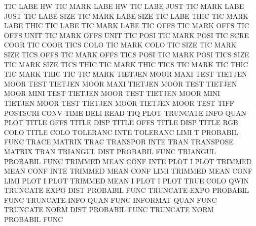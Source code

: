 TIC      LABE HW                        TIC      MARK LABE HW
TIC      LABE JUST                      TIC      MARK LABE JUST
TIC      LABE SIZE                      TIC      MARK LABE SIZE
TIC      LABE THIC                      TIC      MARK LABE THIC
TIC      LABE                           TIC      MARK LABE
TIC      OFFS                           TIC      MARK OFFS
TIC      OFFS UNIT                      TIC      MARK OFFS UNIT
TIC      POSI                           TIC      MARK POSI
TIC      SCRE COOR                      TIC      COOR
TICS     COLO                           TIC      MARK COLO
TIC      SIZE                           TIC      MARK SIZE
TICS     OFFS                           TIC      MARK OFFS
TICS     POSI                           TIC      MARK POSI
TICS     SIZE                           TIC      MARK SIZE
TICS     THIC                           TIC      MARK THIC
TICS                                    TIC      MARK
TIC      THIC                           TIC      MARK THIC
TIC                                     TIC      MARK
TIETJEN  MOOR MAXI TEST                 TIETJEN  MOOR TEST
TIETJEN  MOOR MAXI                      TIETJEN  MOOR TEST
TIETJEN  MOOR MINI TEST                 TIETJEN  MOOR TEST
TIETJEN  MOOR MINI                      TIETJEN  MOOR TEST
TIETJEN  MOOR                           TIETJEN  MOOR TEST
TIFF                                    POSTSCRI CONV
TIME     DELI                           READ
TIQ      PLOT                           TRUNCATE INFO QUAN PLOT
TITLE    OFFS                           TITLE    DISP
TITLE    OFFS                           TITLE    DISP
TITLE    RGB  COLO                      TITLE    COLO
TOLERANC INTE                           TOLERANC LIMI
T                                       PROBABIL FUNC
TRACE                                   MATRIX   TRAC
TRANSPOR INTE                           TRAN
TRANSPOSE                               MATRIX   TRAN
TRIANGUL DIST                           PROBABIL FUNC
TRIANGUL                                PROBABIL FUNC
TRIMMED  MEAN CONF INTE PLOT            I        PLOT
TRIMMED  MEAN CONF INTE                 TRIMMED  MEAN CONF LIMI
TRIMMED  MEAN CONF LIMI PLOT            I        PLOT
TRIMMED  MEAN I    PLOT                 I        PLOT
TRUE     COLO                           QWIN
TRUNCATE EXPO DIST                      PROBABIL FUNC
TRUNCATE EXPO                           PROBABIL FUNC
TRUNCATE INFO QUAN FUNC                 INFORMAT QUAN FUNC
TRUNCATE NORM DIST                      PROBABIL FUNC
TRUNCATE NORM                           PROBABIL FUNC
